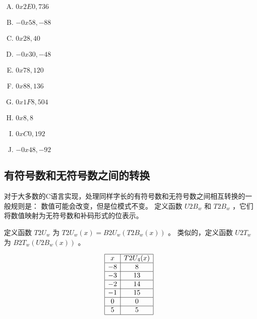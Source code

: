 {{        %
        \begin{practicec}
            \begin{enumerate}[A.]
                \item $0x2E0, 736$
                \item $-0x58, -88$
                \item $0x28, 40$
                \item $-0x30, -48$
                \item $0x78, 120$
                \item $0x88, 136$
                \item $0x1F8, 504$
                \item $0x8, 8$
                \item $0xC0, 192$
                \item $-0x48, -92$
            \end{enumerate}
        \end{practicec}
    }

    \subsection{有符号数和无符号数之间的转换}
    {
        对于大多数的C语言实现，处理同样字长的有符号数和无符号数之间相互转换的一般规则是：
        数值可能会改变，但是位模式不变。
        定义函数 $U2B_w$ 和 $T2B_w$ ，它们将数值映射为无符号数和补码形式的位表示。

        定义函数 $T2U_w$ 为 $T2U_w(x) = B2U_w(T2B_w(x))$ 。
        类似的，定义函数 $U2T_w$ 为 $B2T_w(U2B_w(x))$ 。

        \begin{practicec}
            \begin{table}[H]
                \[
                    \begin{array}{|c|c|}
                        \hline
                        x & T2U_4(x) \\
                        \hline
                        -8 & 8 \\
                        \hline
                        -3 & 13 \\
                        \hline
                        -2 & 14 \\
                        \hline
                        -1 & 15 \\
                        \hline
                        0 & 0 \\
                        \hline
                        5 & 5 \\
                        \hline
                    \end{array}
                \]
            \end{table}
        \end{practicec}

}}
